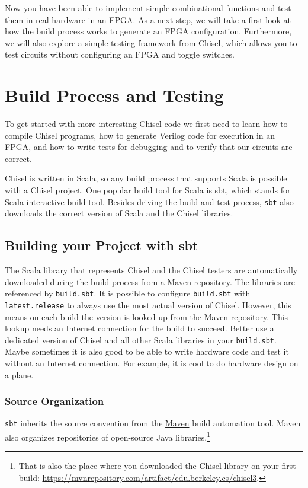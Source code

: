 \documentclass[%
    10pt, %
    headinclude, footexclude,
    openright, %
    notitlepage,
    cleardoubleempty,
    headsepline,
    pointlessnumbers,
    bibtotoc, idxtotoc,
    ]{scrbook}
\newcommand{\code}[1]{{\small{\texttt{#1}}}}
\newcommand{\myref}[2]{\href{#1}{#2}}
\begin{document}
Now you have been able to implement simple combinational functions and test them
in real hardware in an FPGA. As a next step, we will take a first look at how the build
process works to generate an FPGA configuration. Furthermore, we will also
explore a simple testing framework from Chisel, which allows you to test circuits
without configuring an FPGA and toggle switches.

\chapter{Build Process and Testing}

To get started with more interesting Chisel code we first need to learn how to compile
Chisel programs, how to generate Verilog code for execution in an FPGA, and how
to write tests for debugging and to verify that our circuits are correct.

Chisel is written in Scala, so any build process that supports Scala is possible
with a Chisel project. One popular build tool for Scala is \myref{https://www.scala-sbt.org/}{sbt},
which stands for Scala interactive build tool.
Besides driving the build and test process, \code{sbt} also downloads the correct
version of Scala and the Chisel libraries.

\section{Building your Project with sbt}

The Scala library that represents Chisel and the Chisel testers are automatically
downloaded during the build process from a Maven repository.
The libraries are referenced by \code{build.sbt}. It is possible to configure \code{build.sbt}
with \code{latest.release} to always use the most actual version of Chisel.
However, this means on each build the version is looked up from the Maven
repository. This lookup needs an Internet connection for the build to succeed.
Better use a dedicated version of Chisel and all other Scala libraries in your \code{build.sbt}.
Maybe sometimes it is also good to be able to write hardware code and test it without an Internet connection.
For example, it is cool to do hardware design on a plane.

\subsection{Source Organization}

\code{sbt} inherits the source convention from the \myref{https://maven.apache.org/}{Maven}
build automation tool. Maven also organizes repositories of open-source Java libraries.\footnote{That is
also the place where you downloaded the Chisel library on your first build:
\url{https://mvnrepository.com/artifact/edu.berkeley.cs/chisel3}.}
\end{document}

